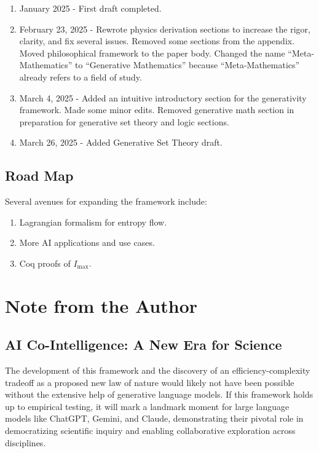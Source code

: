 \documentclass[12pt]{article}
\begin{document}
\begin{enumerate}
    \item January 2025 - First draft completed.
    \item February 23, 2025 - Rewrote physics derivation sections to increase the rigor, clarity, and fix several issues. Removed some sections from the appendix. Moved philosophical framework to the paper body. Changed the name ``Meta-Mathematics'' to ``Generative Mathematics'' because ``Meta-Mathematics'' already refers to a field of study.
    \item March 4, 2025 - Added an intuitive introductory section for the generativity framework. Made some minor edits. Removed generative math section in preparation for generative set theory and logic sections.
    \item March 26, 2025 - Added Generative Set Theory draft.
\end{enumerate}

\subsection{Road Map}
Several avenues for expanding the framework include:
\begin{enumerate}
    \item Lagrangian formalism for entropy flow.
    \item More AI applications and use cases.
    \item Coq proofs of $I_\text{max}$.
\end{enumerate}

\section*{Note from the Author}

\subsection*{AI Co-Intelligence: A New Era for Science}

The development of this framework and the discovery of an efficiency-complexity tradeoff as a proposed new law of nature would likely not have been possible without the extensive help of generative language models. If this framework holds up to empirical testing, it will mark a landmark moment for large language models like ChatGPT, Gemini, and Claude, demonstrating their pivotal role in democratizing scientific inquiry and enabling collaborative exploration across disciplines.
\end{document}
